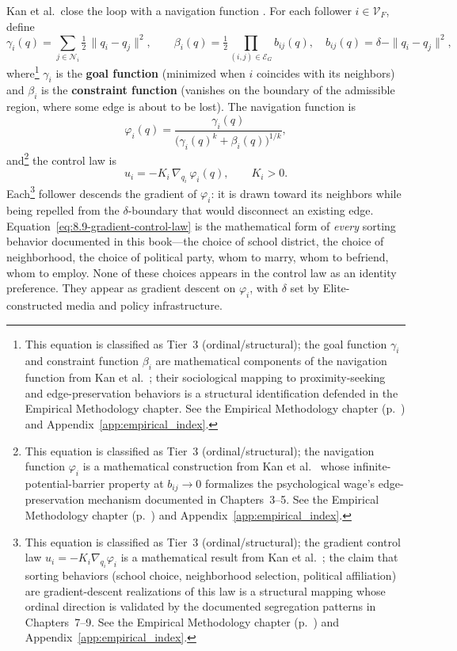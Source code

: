 Kan et al.\ close the loop with a navigation function \cite{kan_containment}. For each follower $i \in \mathcal{V}_F$, define
\begin{equation}
\gamma_i(q) = \sum_{j \in \mathcal{N}_i} \tfrac{1}{2}\,\|q_i - q_j\|^2, \qquad
\beta_i(q) = \tfrac{1}{2}\!\!\prod_{(i,j) \in \mathcal{E}_G}\!\! b_{ij}(q),
\quad b_{ij}(q) = \delta - \|q_i - q_j\|^2, \label{eq:8.7-navigation-components}
\end{equation}
where\footnote{This equation is classified as Tier~3 (ordinal/structural); the goal function $\gamma_i$ and constraint function $\beta_i$ are mathematical components of the navigation function from Kan et al.\ \cite{kan_containment}; their sociological mapping to proximity-seeking and edge-preservation behaviors is a structural identification defended in the Empirical Methodology chapter. See the Empirical Methodology chapter (p.~\pageref{ch:empirical_methodology}) and Appendix~\ref{app:empirical_index}.} $\gamma_i$ is the \textbf{goal function} (minimized when $i$ coincides with its neighbors) and $\beta_i$ is the \textbf{constraint function} (vanishes on the boundary of the admissible region, where some edge is about to be lost). The navigation function is
\begin{equation}
\varphi_i(q) = \frac{\gamma_i(q)}{\bigl(\gamma_i(q)^k + \beta_i(q)\bigr)^{1/k}}, \label{eq:8.8-navigation-function}
\end{equation}
and\footnote{This equation is classified as Tier~3 (ordinal/structural); the navigation function $\varphi_i$ is a mathematical construction from Kan et al.\ \cite{kan_containment} whose infinite-potential-barrier property at $b_{ij} \to 0$ formalizes the psychological wage's edge-preservation mechanism documented in Chapters~3--5. See the Empirical Methodology chapter (p.~\pageref{ch:empirical_methodology}) and Appendix~\ref{app:empirical_index}.} the control law is
\begin{equation}
u_i = -K_i\, \nabla_{q_i}\,\varphi_i(q), \qquad K_i > 0. \label{eq:8.9-gradient-control-law}
\end{equation}
Each\footnote{This equation is classified as Tier~3 (ordinal/structural); the gradient control law $u_i = -K_i \nabla_{q_i} \varphi_i$ is a mathematical result from Kan et al.\ \cite{kan_containment}; the claim that sorting behaviors (school choice, neighborhood selection, political affiliation) are gradient-descent realizations of this law is a structural mapping whose ordinal direction is validated by the documented segregation patterns in Chapters~7--9. See the Empirical Methodology chapter (p.~\pageref{ch:empirical_methodology}) and Appendix~\ref{app:empirical_index}.} follower descends the gradient of $\varphi_i$: it is drawn toward its neighbors while being repelled from the $\delta$-boundary that would disconnect an existing edge. Equation~\ref{eq:8.9-gradient-control-law} is the mathematical form of \textit{every} sorting behavior documented in this book---the choice of school district, the choice of neighborhood, the choice of political party, whom to marry, whom to befriend, whom to employ. None of these choices appears in the control law as an identity preference. They appear as gradient descent on $\varphi_i$, with $\delta$ set by Elite-constructed media and policy infrastructure.

